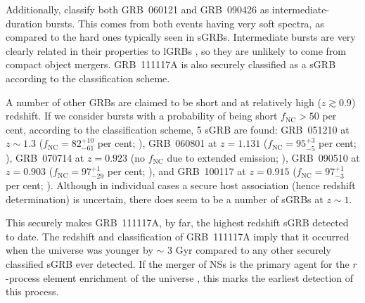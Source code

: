 \documentclass{aa}    %
\begin{document}
Additionally, \citet{Horvath2010} classify both GRB~060121 and GRB~090426 as
intermediate-duration bursts. This comes from both events having very soft
spectra, as compared to the hard ones typically seen in sGRBs. Intermediate
bursts are very clearly related in their properties to lGRBs
\citep{DeUgartePostigo2011}, so they are unlikely to come from compact object
mergers. GRB~111117A is also securely classified as a sGRB according to the
\citet{Horvath2010} classification scheme.

A number of other GRBs are claimed to be short and at relatively high ($z \gtrsim 0.9$) redshift.
If we consider bursts with a probability of being short $f_{\mathrm{NC}} > 50$ per cent, according to the
\citet{Bromberg2013} classification scheme, 5 sGRB are found:
GRB~051210 at $z \sim 1.3$ ($f_{\mathrm{NC}} = 82_{-61}^{+10}$ per cent;
\citealt{Leibler2010}),
GRB~060801 at $z = 1.131$ ($f_{\mathrm{NC}} = 95_{-5}^{+3}$ per cent;
\citealt{Berger2007}),
GRB~070714 at $z = 0.923$ (no $f_{\mathrm{NC}}$ due to extended emission;
\citealt{Graham2009}),
GRB~090510 at $z = 0.903$ ($f_{\mathrm{NC}} = 97_{-29}^{+1}$ per cent;
\citealt{McBreen2010}), and
GRB~100117 at $z = 0.915$ ($f_{\mathrm{NC}} = 97_{-3}^{+1}$ per cent;
\citealt{Fong2011}). Although in individual cases a secure host association
(hence redshift determination) is uncertain, there does seem to be a number of sGRBs at $z
\sim 1$.

This securely makes GRB~111117A, by far, the highest redshift sGRB detected to
date. The redshift and classification of GRB~111117A imply that it occurred when
the universe was younger by $\sim$ 3 Gyr compared to any other securely
classified sGRB ever detected. If the merger of NSs is the primary agent for the
$r$-process element enrichment of the universe \citep{Goriely2011, Ji2016,
	Komiya2016}, this marks the earliest detection of this process.
\end{document}
